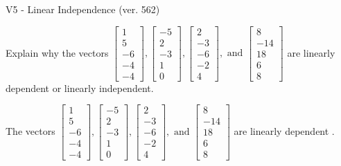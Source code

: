 \begin{exercise}
  \begin{exerciseTitle}V5 - Linear Independence (ver. 562)\end{exerciseTitle}
  \begin{exerciseStatement}
    Explain why the vectors \(\left[\begin{array}{r}
1 \\
5 \\
-6 \\
-4 \\
-4
\end{array}\right] , \left[\begin{array}{r}
-5 \\
2 \\
-3 \\
1 \\
0
\end{array}\right] , \left[\begin{array}{r}
2 \\
-3 \\
-6 \\
-2 \\
4
\end{array}\right] , \text{ and } \left[\begin{array}{r}
8 \\
-14 \\
18 \\
6 \\
8
\end{array}\right]\) are linearly dependent or linearly independent.	


  \end{exerciseStatement}
  \begin{exerciseAnswer}
   The vectors \(\left[\begin{array}{r}
1 \\
5 \\
-6 \\
-4 \\
-4
\end{array}\right] , \left[\begin{array}{r}
-5 \\
2 \\
-3 \\
1 \\
0
\end{array}\right] , \left[\begin{array}{r}
2 \\
-3 \\
-6 \\
-2 \\
4
\end{array}\right] , \text{ and } \left[\begin{array}{r}
8 \\
-14 \\
18 \\
6 \\
8
\end{array}\right]\) are 
  	 linearly dependent  .
  


  \end{exerciseAnswer}
\end{exercise}